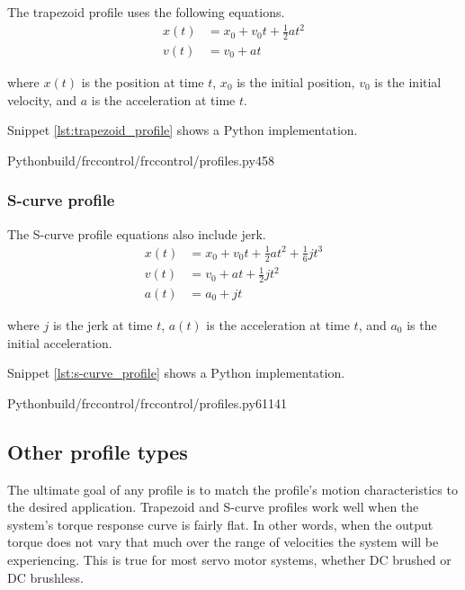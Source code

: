 The trapezoid profile uses the following equations.
\begin{align*}
  x(t) &= x_0 + v_0t + \frac{1}{2}at^2 \\
  v(t) &= v_0 + at
\end{align*}

where $x(t)$ is the position at time $t$, $x_0$ is the initial position, $v_0$
is the initial velocity, and $a$ is the acceleration at time $t$.

Snippet \ref{lst:trapezoid_profile} shows a Python implementation.
\begin{coderemotesubset}{Python}{build/frccontrol/frccontrol/profiles.py}{4}{58}
  \caption{Trapezoid profile implementation in Python}
  \label{lst:trapezoid_profile}
\end{coderemotesubset}

\subsubsection{S-curve profile}

The S-curve profile equations also include jerk.
\begin{align*}
  x(t) &= x_0 + v_0t + \frac{1}{2}at^2 + \frac{1}{6}jt^3 \\
  v(t) &= v_0 + at + \frac{1}{2}jt^2 \\
  a(t) &= a_0 + jt
\end{align*}

where $j$ is the jerk at time $t$, $a(t)$ is the acceleration at time $t$, and
$a_0$ is the initial acceleration.

Snippet \ref{lst:s-curve_profile} shows a Python implementation.
\begin{coderemotesubset}{Python}{build/frccontrol/frccontrol/profiles.py}{61}{141}
  \caption{S-curve profile implementation in Python}
  \label{lst:s-curve_profile}
\end{coderemotesubset}

\subsection{Other profile types}

The ultimate goal of any profile is to match the profile's motion
characteristics to the desired application. Trapezoid and S-curve profiles work
well when the \gls{system}'s torque response curve is fairly flat. In other
words, when the output torque does not vary that much over the range of
velocities the \gls{system} will be experiencing. This is true for most servo
motor systems, whether DC brushed or DC brushless.

